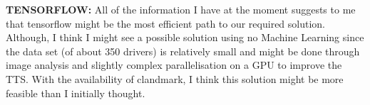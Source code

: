 \documentclass{article}
\begin{document}
\textbf{TENSORFLOW:}
    All of the information I have at the moment suggests to me that tensorflow might be the most efficient path to our required 
    solution. Although, I think I might see a possible solution using no Machine Learning since the data set (of about 350 drivers)
    is relatively small and might be done through image analysis and slightly complex parallelisation on a GPU to improve the TTS. 
    With the availability of clandmark, I think this solution might be more feasible than I initially thought.
\end{document}
